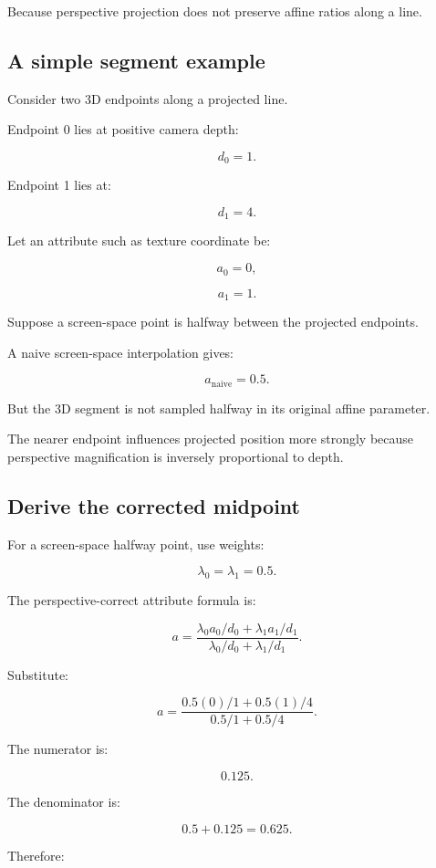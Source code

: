 Because perspective projection does not preserve affine ratios along a line.

\subsection{A simple segment example}\label{02-foundations-ii-ch034-a-simple-segment-example}

Consider two 3D endpoints along a projected line.

Endpoint 0 lies at positive camera depth:

\[
 d_0=1.
\]

Endpoint 1 lies at:

\[
 d_1=4.
\]

Let an attribute such as texture coordinate be:

\[
 a_0=0,
\]

\[
 a_1=1.
\]

Suppose a screen-space point is halfway between the projected endpoints.

A naive screen-space interpolation gives:

\[
 \boxed{ a_{\mathrm{naive}}=0.5 }.
\]

But the 3D segment is not sampled halfway in its original affine parameter.

The nearer endpoint influences projected position more strongly because perspective magnification is inversely proportional to depth.

\subsection{Derive the corrected midpoint}\label{02-foundations-ii-ch034-derive-the-corrected-midpoint}

For a screen-space halfway point, use weights:

\[
 \lambda_0=\lambda_1=0.5.
\]

The perspective-correct attribute formula is:

\[
 a= \frac{ \lambda_0a_0/d_0+\lambda_1a_1/d_1 }{ \lambda_0/d_0+\lambda_1/d_1 }.
\]

Substitute:

\[
 a= \frac{ 0.5(0)/1+0.5(1)/4 }{ 0.5/1+0.5/4 }.
\]

The numerator is:

\[
 0.125.
\]

The denominator is:

\[
 0.5+0.125=0.625.
\]

Therefore:

